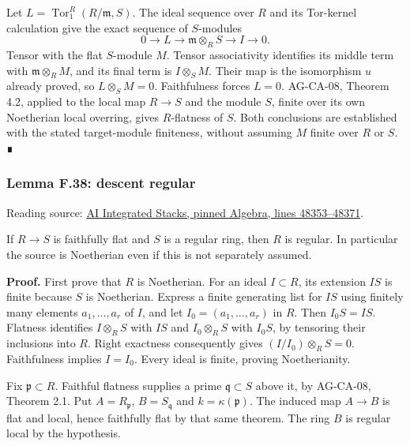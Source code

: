 \documentclass[11pt,a4paper,openany]{report}
\begin{document}
Let \(L=\operatorname{Tor}_1^R(R/\mathfrak m,S)\). The ideal sequence over \(R\) and its Tor-kernel calculation give the exact sequence of \(S\)-modules \[0\longrightarrow L\longrightarrow\mathfrak m\otimes_RS
\longrightarrow I\longrightarrow0.\] Tensor with the flat \(S\)-module \(M\). Tensor associativity identifies its middle term with \(\mathfrak m\otimes_RM\), and its final term is \(I\otimes_SM\). Their map is the isomorphism \(u\) already proved, so \(L\otimes_SM=0\). Faithfulness forces \(L=0\). AG-CA-08, Theorem 4.2, applied to the local map \(R\to S\) and the module \(S\), finite over its own Noetherian local overring, gives \(R\)-flatness of \(S\). Both conclusions are established with the stated target-module finiteness, without assuming \(M\) finite over \(R\) or \(S\). ∎

\label{AG-RG-S05-algebra-lemma-descent-regular}

\subsubsection{Lemma F.38: descent regular}\label{AG-RG-S05-lemma-f.38-descent-regular}

Reading source: \href{https://github.com/KokunoYumeto/unofficial-stacks-project-ai-drafts/blob/565b10e987aba5969b21145a0833f42d69f96790/algebra.tex\#L48353-L48371}{AI Integrated Stacks, pinned Algebra, lines 48353--48371}.

If \(R\to S\) is faithfully flat and \(S\) is a regular ring, then \(R\) is regular. In particular the source is Noetherian even if this is not separately assumed.

\textbf{Proof.} First prove that \(R\) is Noetherian. For an ideal \(I\subset R\), its extension \(IS\) is finite because \(S\) is Noetherian. Express a finite generating list for \(IS\) using finitely many elements \(a_1,\ldots,a_r\) of \(I\), and let \(I_0=(a_1,\ldots,a_r)\) in \(R\). Then \(I_0S=IS\). Flatness identifies \(I\otimes_RS\) with \(IS\) and \(I_0\otimes_RS\) with \(I_0S\), by tensoring their inclusions into \(R\). Right exactness consequently gives \((I/I_0)\otimes_RS=0\). Faithfulness implies \(I=I_0\). Every ideal is finite, proving Noetherianity.

Fix \(\mathfrak p\subset R\). Faithful flatness supplies a prime \(\mathfrak q\subset S\) above it, by AG-CA-08, Theorem 2.1. Put \(A=R_{\mathfrak p}\), \(B=S_{\mathfrak q}\) and \(k=\kappa(\mathfrak p)\). The induced map \(A\to B\) is flat and local, hence faithfully flat by that same theorem. The ring \(B\) is regular local by the hypothesis.
\end{document}
